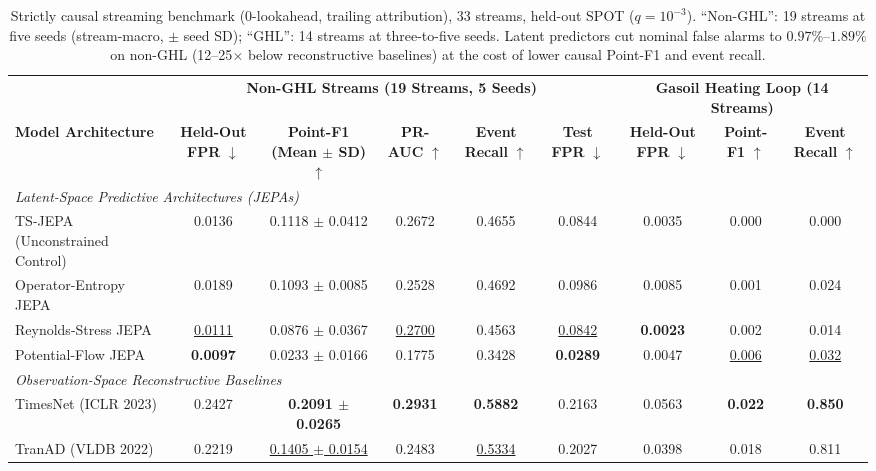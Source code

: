 \begin{table}[t]
\centering
\caption{Strictly causal streaming benchmark ($0$-lookahead, trailing attribution), 33 streams, held-out SPOT ($q{=}10^{-3}$). ``Non-GHL'': 19 streams at five seeds (stream-macro, $\pm$ seed SD); ``GHL'': 14 streams at three-to-five seeds. Latent predictors cut nominal false alarms to $0.97\%\text{--}1.89\%$ on non-GHL (12--25$\times$ below reconstructive baselines) at the cost of lower causal Point-F1 and event recall.}
\label{tab:causal_benchmark}
\small
\scriptsize
\setlength{\tabcolsep}{2.5pt}
\begin{tabular}{@{}l ccccc c cc@{}}
\toprule
& \multicolumn{5}{c}{\textbf{Non-GHL Streams (19 Streams, 5 Seeds)}} & \multicolumn{3}{c}{\textbf{Gasoil Heating Loop (14 Streams)}} \\
\cmidrule(lr){2-6} \cmidrule(lr){7-9}
\textbf{Model Architecture} & \textbf{Held-Out FPR} $\downarrow$ & \textbf{Point-F1 (Mean $\pm$ SD)} $\uparrow$ & \textbf{PR-AUC} $\uparrow$ & \textbf{Event Recall} $\uparrow$ & \textbf{Test FPR} $\downarrow$ & \textbf{Held-Out FPR} $\downarrow$ & \textbf{Point-F1} $\uparrow$ & \textbf{Event Recall} $\uparrow$ \\
\midrule
\multicolumn{9}{l}{\textit{Latent-Space Predictive Architectures (JEPAs)}} \\
TS-JEPA (Unconstrained Control)          & 0.0136 & 0.1118 $\pm$ 0.0412 & 0.2672 & 0.4655 & 0.0844 & 0.0035 & 0.000 & 0.000 \\
Operator-Entropy JEPA                    & 0.0189 & 0.1093 $\pm$ 0.0085 & 0.2528 & 0.4692 & 0.0986 & 0.0085 & 0.001 & 0.024 \\
Reynolds-Stress JEPA                     & \underline{0.0111} & 0.0876 $\pm$ 0.0367 & \underline{0.2700} & 0.4563 & \underline{0.0842} & \textbf{0.0023} & 0.002 & 0.014 \\
Potential-Flow JEPA                      & \textbf{0.0097} & 0.0233 $\pm$ 0.0166 & 0.1775 & 0.3428 & \textbf{0.0289} & 0.0047 & \underline{0.006} & \underline{0.032} \\
\midrule
\multicolumn{9}{l}{\textit{Observation-Space Reconstructive Baselines}} \\
TimesNet (ICLR 2023)                     & 0.2427 & \textbf{0.2091 $\pm$ 0.0265} & \textbf{0.2931} & \textbf{0.5882} & 0.2163 & 0.0563 & \textbf{0.022} & \textbf{0.850} \\
TranAD (VLDB 2022)                       & 0.2219 & \underline{0.1405 $\pm$ 0.0154} & 0.2483 & \underline{0.5334} & 0.2027 & 0.0398 & 0.018 & 0.811 \\
\bottomrule
\end{tabular}
\end{table}
